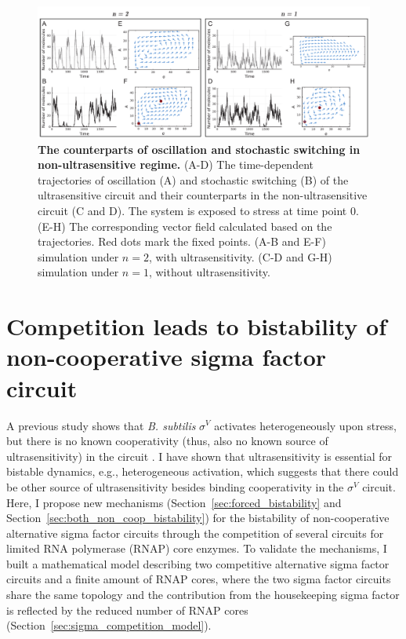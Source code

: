 \begin{figure}[ht]
    \centering
    \includegraphics[width = 6in]{non_ultrasensitive_counterparts.pdf}
    \caption[
        The counterparts of oscillation and stochastic switching in 
        non-ultrasensitive regime
        ]{
        \textbf{The counterparts of oscillation and stochastic switching in 
        non-ultrasensitive regime.}
        (A-D) The time-dependent trajectories of 
        oscillation (A) and stochastic switching (B)
        of the ultrasensitive circuit and their counterparts in the
        non-ultrasensitive circuit (C and D).
        The system is exposed to stress at time point 0.
        (E-H) The corresponding vector field calculated based on
        the trajectories. Red dots mark the fixed points.
        (A-B and E-F) simulation under $n = 2$, with ultrasensitivity.
        (C-D and G-H) simulation under $n = 1$, without ultrasensitivity.
    }
    \label{fig:non_us_counterparts}
\end{figure}

\clearpage    %
\section{Competition leads to bistability of non-cooperative sigma factor circuit}
\label{sec:competition_to_us}

A previous study shows that \textit{B. subtilis} $\sigma^V$ activates 
heterogeneously upon stress, but there is no known cooperativity 
(thus, also no known source of ultrasensitivity) in the circuit \cite{schwall21a}. 
I have shown that ultrasensitivity is essential for bistable
dynamics, e.g., heterogeneous activation, which suggests that
there could be other source of ultrasensitivity besides binding
cooperativity in the $\sigma^V$ circuit.
Here, I propose new mechanisms (Section~\ref{sec:forced_bistability} and
Section~\ref{sec:both_non_coop_bistability}) 
for the bistability of non-cooperative
alternative sigma factor circuits through the competition of several circuits
for limited RNA polymerase (RNAP) core enzymes.
To validate the mechanisms, I built a mathematical model describing two 
competitive alternative sigma factor circuits and a finite amount of RNAP cores,
where the two sigma factor circuits share the same topology and 
the contribution from the housekeeping sigma factor is reflected by 
the reduced number of RNAP cores (Section~\ref{sec:sigma_competition_model}).

